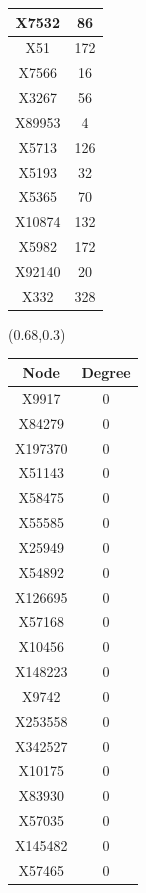 \documentclass{beamer}
\begin{document}
\begin{frame}
{\begin{textblock*}{\paperwidth}
\begin{tabular}{| c c |}
X7532  &  86 \\ \hline 
X51  &  172 \\ \hline 
X7566  &  16 \\ \hline 
X3267  &  56 \\ \hline 
X89953  &  4 \\ \hline 
X5713  &  126 \\ \hline 
X5193  &  32 \\ \hline 
X5365  &  70 \\ \hline 
X10874  &  132 \\ \hline 
X5982  &  172 \\ \hline 
X92140  &  20 \\ \hline 
X332  &  328 \\ \hline 
    \end{tabular}
    \hspace{.5em}
  \end{textblock*}
  \begin{textblock*}{\paperwidth}(0.68\textwidth,0.3\textheight)
    \raggedright 
    \tiny
    \begin{tabular}{| c c |}
      \hline
\cellcolor[gray]{0.8} Node & \cellcolor[gray]{0.8} Degree \\ \hline
X9917  &  0 \\ \hline 
X84279  &  0 \\ \hline 
X197370  &  0 \\ \hline 
X51143  &  0 \\ \hline 
X58475  &  0 \\ \hline 
X55585  &  0 \\ \hline 
X25949  &  0 \\ \hline 
X54892  &  0 \\ \hline 
X126695  &  0 \\ \hline 
X57168  &  0 \\ \hline 
X10456  &  0 \\ \hline 
X148223  &  0 \\ \hline 
X9742  &  0 \\ \hline 
X253558  &  0 \\ \hline 
X342527  &  0 \\ \hline 
X10175  &  0 \\ \hline 
X83930  &  0 \\ \hline 
X57035  &  0 \\ \hline 
X145482  &  0 \\ \hline 
X57465  &  0 \\ \hline 
    \end{tabular}
    \hspace{.5em}
  \end{textblock*}
}
\end{frame}
\end{document}
